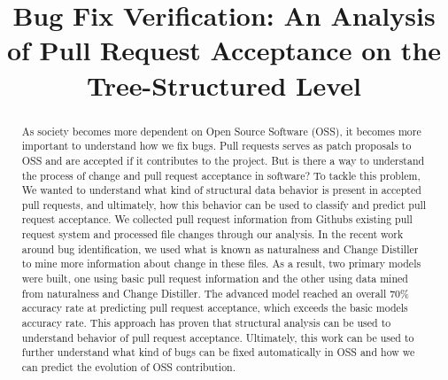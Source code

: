 \documentclass[10pt, conference]{IEEEtran}
\begin{document}
%
\title{Bug Fix Verification: An Analysis of Pull Request Acceptance on the Tree-Structured Level}



\author{
}
\maketitle


\begin{abstract}
As society becomes more dependent on Open Source Software (OSS), it becomes more important to understand how we fix bugs. Pull requests serves as patch proposals to OSS and are accepted if it contributes to the project. But is there a way to understand the process of change and pull request acceptance in software? To tackle this problem, We wanted to understand what kind of structural data behavior is present in accepted pull requests, and ultimately, how this behavior can be used to classify and predict pull request acceptance. We collected pull request information from Github\textquotesingle s existing pull request system and processed file changes through our analysis. In the recent work around bug identification, we used what is known as naturalness and Change Distiller to mine more information about change in these files. As a result, two primary models were built, one using basic pull request information and the other using data mined from naturalness and Change Distiller. The advanced model reached an overall 70\% accuracy rate at predicting pull request acceptance, which exceeds the basic model\textquotesingle s accuracy rate. This approach has proven that structural analysis can be used to understand behavior of pull request acceptance. Ultimately, this work can be used to further understand what kind of bugs can be fixed automatically in OSS and how we can predict the evolution of OSS contribution.
\end{abstract}
\IEEEpeerreviewmaketitle
\end{document}

